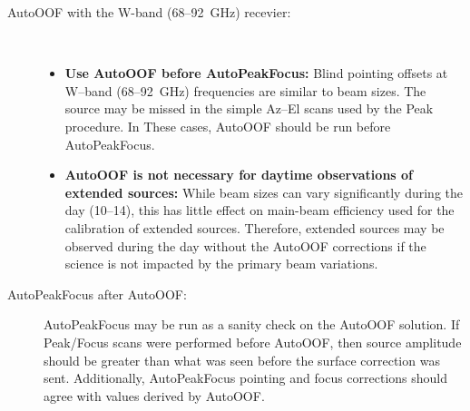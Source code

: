 \begin{description}
\item[AutoOOF with the W-band (68--92~GHz) recevier:]\ \\
\begin{itemize}
\item {\bf Use AutoOOF before AutoPeakFocus:} Blind pointing offsets at W--band
(68--92~GHz) frequencies are similar to beam sizes.  The source may be missed
in the simple Az--El scans used by the Peak procedure.  In These cases, AutoOOF should
be run before AutoPeakFocus.
\item {\bf AutoOOF is not necessary for daytime observations of extended sources:}
While beam sizes can vary significantly during the day (10--14\arcsecond), this has little
effect on main-beam efficiency used for the calibration of extended sources.  Therefore,
extended sources may be observed during the day without the AutoOOF corrections if the
science is not impacted by the primary beam variations.
\end{itemize}

\item[AutoPeakFocus after AutoOOF:] AutoPeakFocus may be run as a sanity check on the
AutoOOF solution.  If Peak/Focus scans were performed before AutoOOF, then source amplitude
should be greater than what was seen before the surface correction was sent.  Additionally,
AutoPeakFocus pointing and focus corrections should agree with values derived by AutoOOF.

\end{description}


